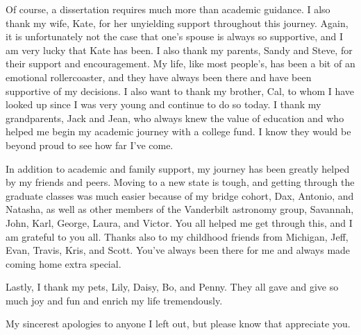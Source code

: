 \begin{doublespace}
Of course, a dissertation requires much more than academic guidance.
I also thank my wife, Kate, for her unyielding support throughout this journey.
Again, it is unfortunately not the case that one's spouse is always so
supportive, and I am very lucky that Kate has been.
I also thank my parents, Sandy and Steve, for their support and encouragement.
My life, like most people's, has been a bit of an emotional rollercoaster,
and they have always been there and have been supportive of my decisions.
I also want to thank my brother, Cal, to whom I have looked up since I was
very young and continue to do so today.
I thank my grandparents, Jack and Jean, who always knew the value
of education and who helped me begin my academic journey with a college fund.
I know they would be beyond proud to see how far I've come.

In addition to academic and family support, my journey has been greatly
helped by my friends and peers.
Moving to a new state is tough, and
getting through the graduate classes was much easier because of my
bridge cohort, Dax, Antonio, and Natasha, as well as other members of the
Vanderbilt astronomy group, Savannah, John, Karl, George, Laura, and Victor.
You all helped me get through this, and I am grateful to you all.
Thanks also to my childhood friends from Michigan,
Jeff, Evan, Travis, Kris, and Scott.
You've always been there for me and always made coming home extra special.

Lastly, I thank my pets, Lily, Daisy, Bo, and Penny.
They all gave and give so much joy and fun and enrich my life tremendously.

My sincerest apologies to anyone I left out, but please know that appreciate
you.

\end{doublespace}
